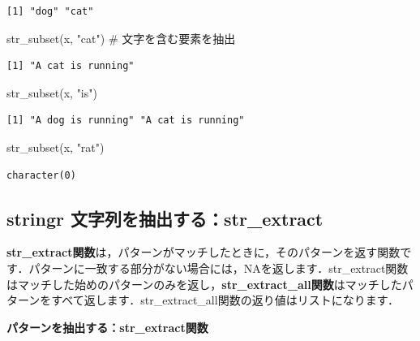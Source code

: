 \documentclass[
  letterpaper,
  DIV=11,
  numbers=noendperiod]{scrreprt}
\newenvironment{Shaded}{\begin{snugshade}}{\end{snugshade}}
\newcommand{\CommentTok}[1]{\textcolor[rgb]{0.37,0.37,0.37}{#1}}
\newcommand{\FunctionTok}[1]{\textcolor[rgb]{0.28,0.35,0.67}{#1}}
\newcommand{\NormalTok}[1]{\textcolor[rgb]{0.00,0.23,0.31}{#1}}
\newcommand{\StringTok}[1]{\textcolor[rgb]{0.13,0.47,0.30}{#1}}
\begin{document}
\begin{verbatim}
[1] "dog" "cat"
\end{verbatim}

\begin{Shaded}
\begin{Highlighting}[]
\FunctionTok{str\_subset}\NormalTok{(x, }\StringTok{"cat"}\NormalTok{) }\CommentTok{\# 文字を含む要素を抽出}
\end{Highlighting}
\end{Shaded}

\begin{verbatim}
[1] "A cat is running"
\end{verbatim}

\begin{Shaded}
\begin{Highlighting}[]
\FunctionTok{str\_subset}\NormalTok{(x, }\StringTok{"is"}\NormalTok{)}
\end{Highlighting}
\end{Shaded}

\begin{verbatim}
[1] "A dog is running" "A cat is running"
\end{verbatim}

\begin{Shaded}
\begin{Highlighting}[]
\FunctionTok{str\_subset}\NormalTok{(x, }\StringTok{"rat"}\NormalTok{)}
\end{Highlighting}
\end{Shaded}

\begin{verbatim}
character(0)
\end{verbatim}

\hypertarget{stringr-ux6587ux5b57ux5217ux3092ux62bdux51faux3059ux308bstr_extract}{%
\subsection{stringr
文字列を抽出する：str\_extract}\label{stringr-ux6587ux5b57ux5217ux3092ux62bdux51faux3059ux308bstr_extract}}

\textbf{str\_extract関数}は，パターンがマッチしたときに，そのパターンを返す関数です．パターンに一致する部分がない場合には，NAを返します．str\_extract関数はマッチした始めのパターンのみを返し，\textbf{str\_extract\_all関数}はマッチしたパターンをすべて返します．str\_extract\_all関数の返り値はリストになります．

\textbf{パターンを抽出する：str\_extract関数}
\end{document}
